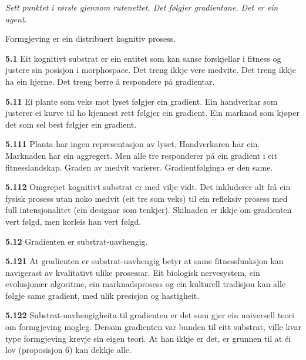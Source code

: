 \documentclass[11pt, a4paper]{article}
\newcommand{\prop}[1]{\bigskip\noindent{\Large\textbf{\textcolor{propcolor}{#1}}}\quad}
\newcommand{\subprop}[1]{\medskip\noindent\textbf{#1}\quad}
\begin{document}
\vspace{1.5em}
\begin{center}
\emph{Sett punktet i r\o rsle gjennom rutenettet. Det f\o lgjer gradientane. Det er ein agent.}
\end{center}
\vspace{1.5em}



\prop{5} Formgjeving er ein distribuert kognitiv prosess.

\subprop{5.1} Eit kognitivt substrat er ein entitet som kan sanse forskjellar i fitness og justere sin posisjon i morphospace. Det treng ikkje vere medvite. Det treng ikkje ha ein hjerne. Det treng berre \aa{} respondere p\aa{} gradientar.

\subprop{5.11} Ei plante som veks mot lyset f\o lgjer ein gradient. Ein handverkar som justerer ei kurve til ho kjennest rett f\o lgjer ein gradient. Ein marknad som kj\o per det som sel best f\o lgjer ein gradient.

\subprop{5.111} Planta har ingen representasjon av lyset. Handverkaren har ein. Marknaden har ein aggregert. Men alle tre responderer p\aa{} ein gradient i eit fitnesslandskap. Graden av medvit varierer. Gradientf\o lginga er den same.

\subprop{5.112} Omgrepet \guillemotleft kognitivt substrat\guillemotright{} er med vilje vidt. Det inkluderer alt fr\aa{} ein fysisk prosess utan noko medvit (eit tre som veks) til ein refleksiv prosess med full intensjonalitet (ein designar som tenkjer). Skilnaden er ikkje om gradienten vert f\o lgd, men korleis han vert f\o lgd.

\subprop{5.12} Gradienten er substrat-uavhengig.

\subprop{5.121} At gradienten er substrat-uavhengig betyr at same fitnessfunksjon kan navigerast av kvalitativt ulike prosessar. Eit biologisk nervesystem, ein evolusjon\ae r algoritme, ein marknadsprosess og ein kulturell tradisjon kan alle f\o lgje same gradient, med ulik presisjon og hastigheit.

\subprop{5.122} Substrat-uavhengigheita til gradienten er det som gjer ein universell teori om formgjeving mogleg. Dersom gradienten var bunden til eitt substrat, ville kvar type formgjeving krevje sin eigen teori. At han ikkje er det, er grunnen til at \'ei lov (proposisjon 6) kan dekkje alle.
\end{document}
